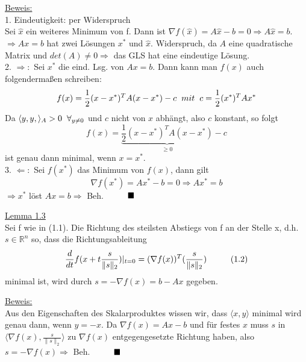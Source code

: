 \documentclass[a4paper]{letter}
\begin{document}
\underline{Beweis:}
\\1. Eindeutigkeit: per Widerspruch
\\Sei $\hat x$ ein weiteres Minimum von f. Dann ist $\nabla f(\hat x) = A\hat x - b = 0 \Rightarrow A\hat x = b$.
\\$\Rightarrow Ax = b$ hat zwei L\"osungen $x^{*}$ und $\hat x$. Widerspruch, da $A$ eine quadratische Matrix und $det(A) \ne 0 \Rightarrow $ das GLS hat eine eindeutige L\"osung.
\\2. $\Rightarrow:$ Sei $x^{*}$ die eind. Lsg. von $Ax = b$. Dann kann man $f(x)$ auch folgenderma{\ss}en schreiben:
$$f(x) = \frac 1 2 (x - x^{*})^{T}A(x - x^{*}) - c \hspace{2mm} mit \hspace{2mm} c = \frac 1 2 (x^{*})^{T}Ax^{*}$$
Da $\langle y, y, \rangle _{A} > 0 \hspace{2mm} \forall _{y \ne 0}$ und $c$ nicht von $x$ abh\"angt, also $c$ konstant, so folgt
$$f(x) = \underbrace {\frac 1 2 (x - x^{*})^{T}A(x - x^{*})}_{\ge 0} - c$$
ist genau dann minimal, wenn $x = x^{*}$.
\\3. $\Leftarrow:$ Sei $f(x^{*})$ das Minimum von $f(x)$, dann gilt
$$\nabla f(x^{*}) = Ax^{*} - b = 0 \Rightarrow Ax^{*} = b$$
$\Rightarrow x^{*}$ l\"ost $Ax = b \Rightarrow$ Beh.$\hspace{10mm} \blacksquare$

\underline{Lemma 1.3}
\\Sei f wie in (1.1). Die Richtung des steilsten Abstiegs von f an der Stelle x, d.h. $s\in\mathbb{R}^{n}$ so, dass die Richtungsableitung
$$\frac d {dt} f(x+t\frac s {\|s\|_{2}})|_{t=0} = (\nabla f(x))^{T} (\frac s {\|s\|_{2}}) \hspace{10mm}(1.2)$$
minimal ist, wird durch $s = -\nabla f(x) = b - Ax$ gegeben.

\underline{Beweis:}
\\Aus den Eigenschaften des Skalarproduktes wissen wir, dass $\langle x, y \rangle$ minimal wird genau dann, wenn $y = -x$. Da $\nabla f(x) = Ax - b$ und f\"ur festes $x$ muss $s$ in $\langle {\nabla f(x)}, {\frac s {\|s\|_{2}}} \rangle$ zu $\nabla f(x)$ entgegengesetzte Richtung haben, also $s = -\nabla f(x) \Rightarrow$ Beh.$\hspace{10mm} \blacksquare$
\end{document}
